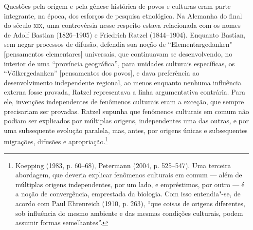 Questões pela origem e pela gênese histórica de povos e culturas eram
parte integrante, na época, dos esforços de pesquisa etnológica. Na
Alemanha do final do século \textsc{xix}, uma controvérsia nesse respeito estava
relacionada com os nomes de Adolf Bastian (1826--1905) e Friedrich Ratzel
(1844--1904). Enquanto Bastian, sem negar processos de difusão, defendia
sua noção de ``Elementargedanken'' {[}pensamentos elementares{]}
universais, que continuavam se desenvolvendo, no interior de uma
``província geográfica'', para unidades culturais específicas, os
``Völkergedanken'' {[}pensamentos dos povos{]}, e dava preferência ao
desenvolvimento independente regional, ao menos enquanto nenhuma
influência externa fosse provada, Ratzel representava a linha
argumentativa contrária. Para ele, invenções independentes de fenômenos
culturais eram a exceção, que sempre precisariam ser provadas. Ratzel
supunha que fenômenos culturais em comum não podiam ser explicados por
múltiplas origens, independentes uma das outras, e por uma subsequente
evolução paralela, mas, antes, por origens únicas e subsequentes
migrações, difusões e apropriação.\footnote{Koepping (1983, p. 60--68),
  Petermann (2004, p. 525--547). Uma terceira abordagem, que deveria
  explicar fenômenos culturais em comum --- além de múltiplas origens
  independentes, por um lado, e empréstimos, por outro --- é a noção de
  convergência, emprestada da biologia. Com isso entendia"-se, de acordo
  com Paul Ehrenreich (1910, p. 263), ``que coisas de origens
  diferentes, sob influência do mesmo ambiente e das mesmas condições
  culturais, podem assumir formas semelhantes''.}

